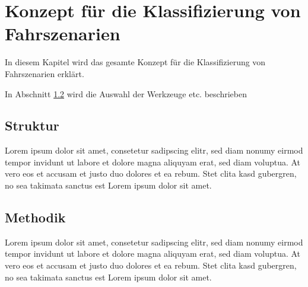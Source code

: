 
\chapter{Konzept für die Klassifizierung von Fahrszenarien}
\label{konzept}

In diesem Kapitel wird das gesamte Konzept für die Klassifizierung von Fahrszenarien erklärt.

In Abschnitt \ref{konzept_methodik} wird die Auswahl der Werkzeuge etc. beschrieben


\section{Struktur}
\label{konzept_struktur}

Lorem ipsum dolor sit amet, consetetur sadipscing elitr, sed diam nonumy eirmod tempor invidunt ut labore et dolore magna aliquyam erat, sed diam voluptua. At vero eos et accusam et justo duo dolores et ea rebum. Stet clita kasd gubergren, no sea takimata sanctus est Lorem ipsum dolor sit amet.  


\section{Methodik}
\label{konzept_methodik}

Lorem ipsum dolor sit amet, consetetur sadipscing elitr, sed diam nonumy eirmod tempor invidunt ut labore et dolore magna aliquyam erat, sed diam voluptua. At vero eos et accusam et justo duo dolores et ea rebum. Stet clita kasd gubergren, no sea takimata sanctus est Lorem ipsum dolor sit amet.  